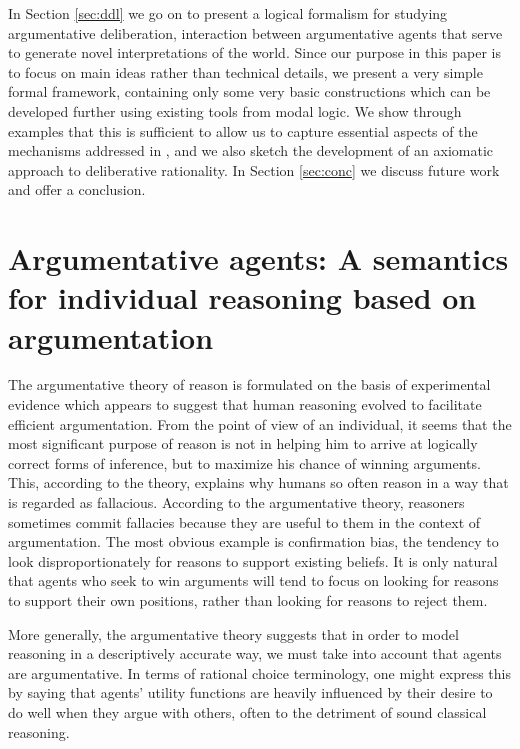 \documentclass[greybox]{svmult}
\begin{document}
In Section \ref{sec:ddl} we go on to present a logical formalism for studying argumentative deliberation, interaction between argumentative agents that serve to generate novel interpretations of the world. Since our purpose in this paper is to focus on main ideas rather than technical details, we present a very simple formal framework, containing only some very basic constructions which can be developed further using existing tools from modal logic. We show through examples that this is sufficient to allow us to capture essential aspects of the mechanisms addressed in \cite{mercier}, and we also sketch the development of an axiomatic approach to deliberative rationality. In Section \ref{sec:conc} we discuss future work and offer a conclusion.

\section{Argumentative agents: A semantics for individual reasoning based on argumentation}\label{sec:arg}

The argumentative theory of reason is formulated on the basis of experimental evidence which appears to suggest that human reasoning evolved to facilitate efficient argumentation. From the point of view of an individual, it seems that the most significant purpose of reason is not in helping him to arrive at logically correct forms of inference, but to maximize his chance of winning arguments. This, according to the theory, explains why humans so often reason in a way that is regarded as fallacious. According to the argumentative theory, reasoners sometimes commit fallacies because they are useful to them in the context of argumentation. The most obvious example is confirmation bias, the tendency to look disproportionately for reasons to support existing beliefs. It is only natural that agents who seek to win arguments will tend to focus on looking for reasons to support their own positions, rather than looking for reasons to reject them.

More generally, the argumentative theory suggests that in order to model reasoning in a descriptively accurate way, we must take into account that agents are argumentative. In terms of rational choice terminology, one might express this by saying that agents' utility functions are heavily influenced by their desire to do well when they argue with others, often to the detriment of sound classical reasoning.
\end{document}
